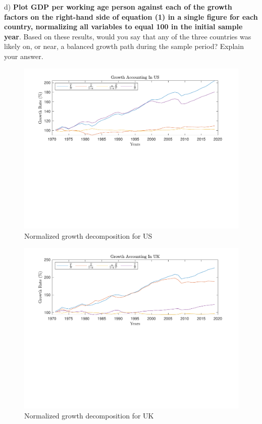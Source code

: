 \documentclass[11pt]{article}
\theoremstyle{mytheoremstyle}
\theoremstyle{mytheoremstyle}
\theoremstyle{myproblemstyle}
\begin{document}
d) \textbf{Plot GDP per working age person against each of the growth factors on the right-hand side of equation (1) in a single figure for each country, normalizing all variables to equal 100 in the initial sample year}. Based on these results, would you say that any of the three countries was likely on, or near, a balanced growth path during the sample period? Explain your answer.

\begin{figure}[htbp]
    \includegraphics[trim = 0in 3.2in 0in 0in, clip, width=1\textwidth]{out/Growth_Accounting_us_normalized.pdf}
    \caption{Normalized growth decomposition for US}
\end{figure}

\begin{figure}[htbp]
    \includegraphics[trim = 0in 3.2in 0in 0in, clip, width=1\textwidth]{out/Growth_Accounting_uk_normalized.pdf}
    \caption{Normalized growth decomposition for UK}
\end{figure}
\end{document}
